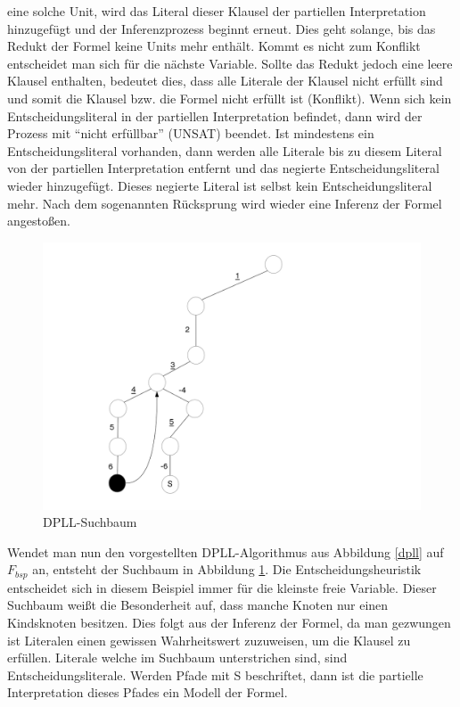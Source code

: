 eine solche Unit, wird das Literal dieser Klausel
der partiellen Interpretation hinzugefügt und der Inferenzprozess
beginnt erneut. Dies geht solange, bis das Redukt der 
Formel keine Units mehr enthält. Kommt es nicht zum
Konflikt entscheidet man sich für die nächste Variable.
Sollte das Redukt jedoch eine leere Klausel enthalten, 
bedeutet dies, dass alle Literale der Klausel nicht
erfüllt sind und somit die Klausel bzw. die Formel nicht 
erfüllt ist (Konflikt). Wenn sich kein Entscheidungsliteral
in der partiellen Interpretation befindet, dann wird
der Prozess mit ``nicht erfüllbar'' (UNSAT) beendet. Ist mindestens ein
Entscheidungsliteral vorhanden, dann werden alle
Literale bis zu diesem Literal von der partiellen 
Interpretation entfernt und das negierte Entscheidungsliteral
wieder hinzugefügt. Dieses negierte Literal ist selbst
kein Entscheidungsliteral mehr. Nach dem sogenannten Rücksprung
wird wieder eine Inferenz 
der Formel angestoßen.
 \begin{figure}[h!]
    \centering
    \includegraphics[width=\textwidth]{abb/dpll-suchbaum.png}
    \caption{DPLL-Suchbaum}
    \label{dpll-suchbaum}
  \end{figure}
Wendet man nun den vorgestellten DPLL-Algorithmus aus Abbildung
\ref{dpll} auf $F_{bsp}$ an, entsteht der Suchbaum in Abbildung
\ref{dpll-suchbaum}. Die Entscheidungsheuristik entscheidet 
sich in diesem Beispiel immer für die kleinste freie Variable.
Dieser Suchbaum weißt die Besonderheit auf,
dass manche Knoten nur einen Kindsknoten besitzen. Dies folgt
aus der Inferenz der Formel, da man gezwungen ist
Literalen einen gewissen Wahrheitswert zuzuweisen, um die Klausel zu
erfüllen. Literale welche im Suchbaum unterstrichen sind, 
sind Entscheidungsliterale. Werden Pfade mit S beschriftet, 
dann ist die partielle Interpretation dieses Pfades ein 
Modell der Formel.


